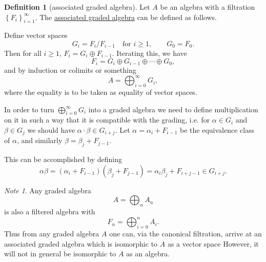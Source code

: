 \documentclass[a4paper]{report}
\newcommand{\defn}[1]{\ul{#1}}
\theoremstyle{definition}
\newtheorem{definition}{Definition}[section]
\theoremstyle{plain}
\theoremstyle{remark}
\newtheorem{note}{Note}[section]
\begin{document}
\begin{definition}[associated graded algebra]
  Let $A$ be an algebra with a filtration $\left\{ F_{i} \right\}_{i = 1}^{\infty}$. The \defn{associated graded algebra} can be defined as follows. 

  Define vector spaces
  \begin{equation*}
    G_{i} = F_{i}/F_{i-1}\quad \text{for }i \geq 1,\qquad G_{0} = F_{0}.
  \end{equation*}
  Then for all $i \geq 1$, $F_{i} = G_{i}\oplus F_{i-1}$. Iterating this, we have
  \begin{equation*}
    F_{i} = G_{i} \oplus G_{i-1} \oplus \cdots \oplus G_{0},
  \end{equation*}
  and by induction or colimits or something
  \begin{equation*}
    A = \bigoplus_{i=0}^{\infty} G_{i},
  \end{equation*}
  where the equality is to be taken as equality of vector spaces.

  In order to turn $\bigoplus_{i=0}^{\infty} G_{i}$ into a graded algebra we need to define multiplication on it in such a way that it is compatible with the grading, i.e. for $\alpha \in G_{i}$ and $\beta \in G_{j}$ we should have $\alpha\cdot\beta \in G_{i+j}$. Let $\alpha = \alpha_{i} + F_{i-1}$ be the equivalence class of $\alpha$, and similarly $\beta = \beta_{j} + F_{j-1}$.

  This can be accomplished by defining
  \begin{equation*}
    \alpha\beta = (\alpha_{i} + F_{i-1})(\beta_{j} + F_{j-1}) = \alpha_{i}\beta_{j} + F_{i+j-1} \in G_{i+j}.
  \end{equation*}
\end{definition}

\begin{note}
  Any graded algebra
  \begin{equation*}
    A = \bigoplus_{n} A_{n}
  \end{equation*}
  is also a filtered algebra with
  \begin{equation*}
    F_{n} = \bigoplus_{i=0}^{n} A_{i}.
  \end{equation*}
  Thus from any graded algebra $A$ one can, via the canonical filtration, arrive at an associated graded algebra which is isomorphic to $A$ as a vector space However, it will not in general be isomorphic to $A$ as an algebra.
\end{note}
\end{document}
